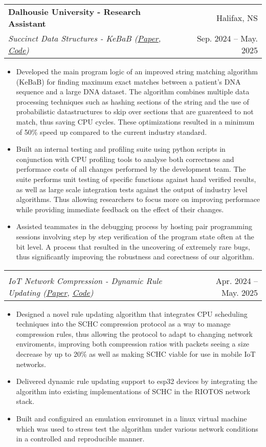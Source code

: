 \documentclass[letterpaper,11pt]{article}
\makeatletter
\newcommand{\resumeItem}[1]{
  \item\small{
    {#1 \vspace{-2pt}}
  }
}
\newcommand{\resumeSubheading}[4]{
  \vspace{-2pt}\item
    \begin{tabular*}{0.97\textwidth}[t]{l@{\extracolsep{\fill}}r}
      \textbf{#1} & #2 \\
			\textit{\small#3} & \small #4 \\
    \end{tabular*}\vspace{-7pt}
}
\newcommand{\resumeItemListStart}{\begin{itemize}}
\newcommand{\resumeItemListEnd}{\end{itemize}\vspace{-5pt}}
\makeatother
\begin{document}
	\resumeSubheading
      {Dalhousie University - Research Assistant}{Halifax, NS}
      {Succinct Data Structures - KeBaB (\href{https://arxiv.org/abs/2502.20338}{\underline{Paper}}, \href{https://github.com/SuchithSridhar/Compact-DNA-Data-Structures}{\underline{Code}})
}{Sep. 2024 -- May. 2025}
      \resumeItemListStart
        \resumeItem{Developed the main program logic of an improved string matching algorithm (KeBaB) for finding maximum exact
					matches between a patient's DNA sequence and a large DNA dataset. The algorithm combines multiple data processing techniques such as
					hashing sections of the string and the use of probabilistic datastructures to skip over sections that are guarenteed to not match, thus saving 
					CPU cycles. These optimizations resulted in a minimum of 50\% speed up compared to the current industry standard.
				}
        \resumeItem{Built an internal testing and profiling suite using python scripts in conjunction with CPU profiling tools to analyse both correctness
					and performace costs of all changes performed by the development team. The suite performs unit testing of specific functions against hand verified results, as
			well as large scale integration tests against the output of industry level algorithms. Thus allowing researchers to focus more on improving performace while providing immediate feedback on the effect of their changes.}
				\resumeItem{Assisted teammates in the debugging process by hosting pair programming sessions involving step by step verification of the program state often at the bit level. A process
				that resulted in the uncovering of extremely rare bugs, thus significantly improving the 
			robustness and corectness of our algorithm.}
      \resumeItemListEnd 

	\vspace{-12pt}
  \resumeSubheading
		{}{}
      {IoT Network Compression - Dynamic Rule Updating (\href{https://github.com/pthread-me/Dynamic-Context-Update-SCHC/blob/main/Thesis.pdf}{\underline{Paper}}, \href{https://github.com/pthread-me/Dynamic-Context-Update-SCHC}{\underline{Code}})}{Apr. 2024 -- May. 2025}
      \resumeItemListStart
				\resumeItem{Designed a novel rule updating algorithm that integrates CPU scheduling techniques into the
				SCHC compression protocol as a way to manage compression rules, thus allowing the protocol to adapt to changing network enviroments, 
				improving both compression ratios with packets seeing a size decrease by up to 20\% as well as making SCHC viable for use in mobile
				IoT networks.}
				\resumeItem{Delivered dynamic rule updating support to esp32 devices by integrating the algorithm into existing 
				implementations of SCHC in the RIOTOS network stack.}
				\resumeItem{Built and configuired an emulation enviromnet in a linux virtual machine which was used to stress test the algorithm under various network conditions in a controlled and reproducible manner.}
			\resumeItemListEnd 
\end{document}
